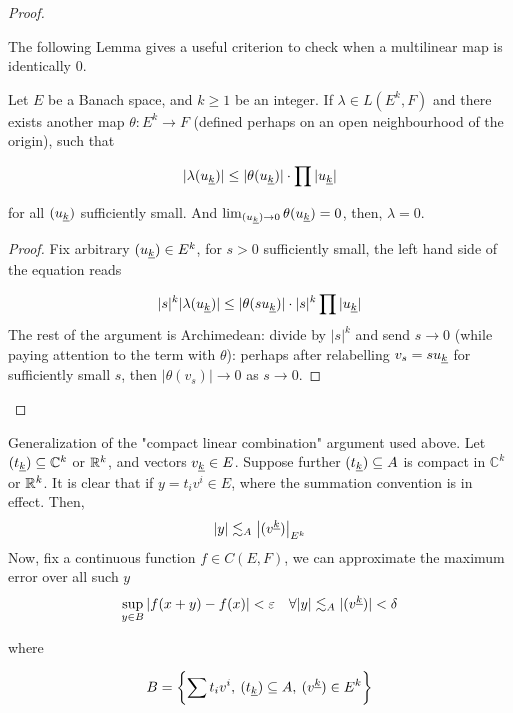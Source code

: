\documentclass[../main-manifolds.tex]{subfiles}
\begin{document}
\begin{proof}
\begin{note}
    The following Lemma gives a useful criterion to check when a multilinear map is identically $0$.
    \begin{lemma}
        Let $E$ be a Banach space, and $k\geq 1$ be an integer. If $\lambda\in L(E^k, F)$ and there exists another map $\theta: E^k\to F$ (defined perhaps on an open neighbourhood of the origin), such that

        \[
        \vert \lambda(\UL{u}[k])\vert \leq\vert\theta(\UL{u}[k])\vert\cdot\prod\vert \UL{u}[k]\vert
        \]
        
        for all $(\UL{u}[k])$ sufficiently small. And $\lim_{(\UL{u}[k]) \to 0}\theta(\UL{u}[k])=0$, then, $\lambda=0$.
    \end{lemma}
    \begin{proof}
        Fix arbitrary $(\UL{u}[k])\in E^k$, for $s>0$ sufficiently small, the left hand side of the equation reads

        \[
            \vert s\vert^k\vert\lambda (\UL{u}[k])\vert\leq\vert\theta(s\UL{u}[k])\vert\cdot\vert s\vert^k\prod \vert\UL{u}[k]\vert
        \]
        The rest of the argument is Archimedean: divide by $\vert s\vert^k$ and send $s\to 0$ (while paying attention to the term with $\theta$): perhaps after relabelling $v_s = s\UL{u}[k]$ for sufficiently small $s$, then $\vert \theta(v_s)\vert\to 0$ as $s\to 0$.
    \end{proof}
        
    \end{note}
    
    

\end{proof}
\begin{remark}\label{rmk:compact-linear-combination}
    Generalization of the "compact linear combination" argument used above. Let $(\UL{t}[k])\subseteq\mathbb{C}^k$ or $\mathbb{R}^k$, and vectors $\UL{v}[k]\in E$. Suppose further $(\UL{t}[k])\subseteq A$ is compact in $\mathbb{C}^k$ or ${\mathbb{R}^k}$. It is clear that if $y = t_iv^i\in E$, where the summation convention is in effect. Then,
    \[
        \abs{y}\lesssim_A \abs{(v^{\underline{k}})}_{E^k}
    \]
    Now, fix a continuous function $f\in C(E,F)$, we can approximate the maximum error over all such $y$
    \[
        \sup_{y\in B}\abs{f(x+y) - f(x)}< \varepsilon\quad\forall \abs{y}\lesssim_A\vert(v^{\underline{k}})\vert < \delta
    \]

    where

    \[
    B = \bigset{\sum t_iv^i,\: (\UL{t}[k])\subseteq A,\: (v^{\underline{k}})\in E^k }
    \]
\end{remark}
\end{document}

